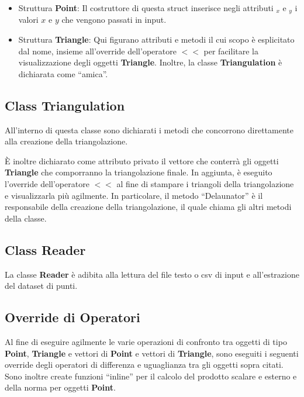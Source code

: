 \documentclass{article}
\begin{document}
\begin{itemize}

\item  Struttura \textbf{Point}: Il costruttore di questa struct inserisce negli attributi $_x$ e $_y$ i valori $x$ e $y$ che vengono passati in input.\\

\item Struttura \textbf{Triangle}: Qui figurano attributi e metodi il cui scopo è esplicitato dal nome,  insieme all'override dell'operatore $<<$ per facilitare la visualizzazione degli oggetti \textbf{Triangle}.  Inoltre,  la classe \textbf{Triangulation} è dichiarata come \enquote{amica}.
\end{itemize}

\subsection{Class Triangulation}
All'interno di questa classe sono dichiarati i metodi che concorrono direttamente alla creazione della triangolazione.

È inoltre dichiarato come attributo privato il vettore che conterrà gli oggetti \textbf{Triangle} che comporranno la triangolazione finale.
In aggiunta,  è eseguito l'override dell'operatore $<<$ al fine di stampare i triangoli della triangolazione e visualizzarla più agilmente. 
In particolare,  il metodo \enquote{Delaunator} è il responsabile della creazione della triangolazione,  il quale chiama gli altri metodi della classe.

\subsection{Class Reader}
La classe \textbf{Reader} è adibita alla lettura del file testo o csv di input e all'estrazione del dataset di punti.

\subsection{Override di Operatori}
Al fine di eseguire agilmente le varie operazioni di confronto tra oggetti di tipo \textbf{Point}, \textbf{Triangle} e vettori di \textbf{Point} e vettori di \textbf{Triangle},  sono eseguiti i seguenti override degli operatori di differenza e uguaglianza tra gli oggetti sopra citati.  Sono inoltre create funzioni \enquote{inline} per il calcolo del prodotto scalare e esterno e della norma per oggetti \textbf{Point}.
\end{document}
